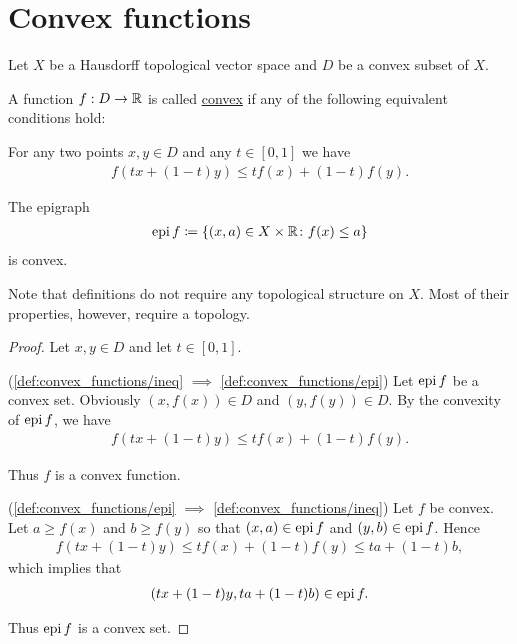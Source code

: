 \section{Convex functions}\label{sec:convex_functions}

Let $X$ be a Hausdorff topological vector space and $D$ be a convex subset of $X$.

\begin{definition}\label{def:convex_functions}
  A function $f: D \to \mathbb R$ is called \uline{convex} if any of the following equivalent conditions hold:

  \begin{defenum}
    \item\label{def:convex_functions/ineq} For any two points $x, y \in D$ and any $t \in [0, 1]$ we have
    \begin{align*}
      f(tx + (1-t)y) \leq tf(x) + (1-t)f(y).
    \end{align*}

    \item\label{def:convex_functions/epi} The epigraph
    \begin{align*}
      \operatorname{epi} f \coloneqq \{ (x, a) \in X \times \mathbb R \colon f(x) \leq a \}
    \end{align*}
    is convex.
  \end{defenum}

  Note that definitions do not require any topological structure on $X$. Most of their properties, however, require a topology.
\end{definition}
\begin{proof}
  Let $x, y \in D$ and let $t \in [0, 1]$.

  (\ref{def:convex_functions/ineq} $\implies$ \ref{def:convex_functions/epi}) Let $\operatorname{epi} f$ be a convex set. Obviously $(x, f(x)) \in D$ and $(y, f(y)) \in D$. By the convexity of $\operatorname{epi} f$, we have
  \begin{align*}
    f(tx + (1-t)y) \leq tf(x) + (1-t)f(y).
  \end{align*}

  Thus $f$ is a convex function.

  (\ref{def:convex_functions/epi} $\implies$ \ref{def:convex_functions/ineq}) Let $f$ be convex. Let $a \geq f(x)$ and $b \geq f(y)$ so that $(x, a) \in \operatorname{epi} f$ and $(y, b) \in \operatorname{epi} f$. Hence
  \begin{align*}
    f(tx + (1-t)y) \leq tf(x) + (1-t)f(y) \leq ta + (1-t)b,
  \end{align*}
  which implies that
  \begin{align*}
    (tx + (1-t)y, ta + (1-t)b) \in \operatorname{epi} f.
  \end{align*}

  Thus $\operatorname{epi} f$ is a convex set.
\end{proof}

